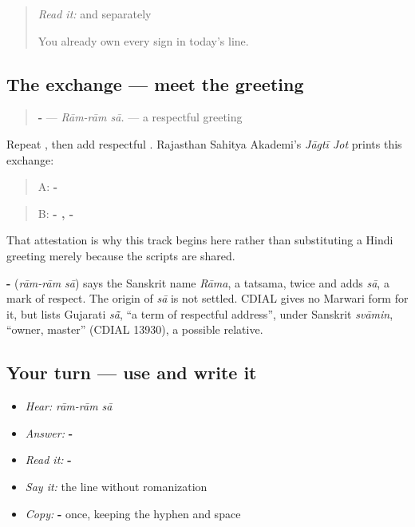 \begin{quote}
\emph{Read it:} \textbf{} and \textbf{} separately

You already own every sign in today's line.
\end{quote}

\subsection*{The exchange — meet the greeting}
\begin{quote}
\textbf{- } — \emph{Rām-rām sā.} — a respectful greeting
\end{quote}

Repeat \textbf{}, then add respectful \textbf{}. Rajasthan Sahitya Akademi's \emph{Jāgtī Jot} prints this exchange:

\begin{quote}
A: \textbf{- }
\end{quote}

\begin{quote}
B: \textbf{- , -}
\end{quote}

That attestation is why this track begins here rather than substituting a Hindi greeting merely because the scripts are shared.

\begin{cousinweb}
\textbf{- } (\emph{rām-rām sā}) says the Sanskrit name \emph{Rāma}, a tatsama, twice and adds \emph{sā}, a mark of respect. The origin of \emph{sā} is not settled. CDIAL gives no Marwari form for it, but lists Gujarati \emph{sā̃}, \textquotedblleft{}a term of respectful address\textquotedblright{}, under Sanskrit \emph{svāmin}, \textquotedblleft{}owner, master\textquotedblright{} (CDIAL 13930), a possible relative.
\end{cousinweb}

\subsection*{Your turn — use and write it}
\begin{itemize}
\raggedright
  \item \emph{Hear:} \emph{rām-rām sā}
  \item \emph{Answer:} \textbf{- }
  \item \emph{Read it:} \textbf{- }
  \item \emph{Say it:} the line without romanization
  \item \emph{Copy:} \textbf{- } once, keeping the hyphen and space
\end{itemize}

